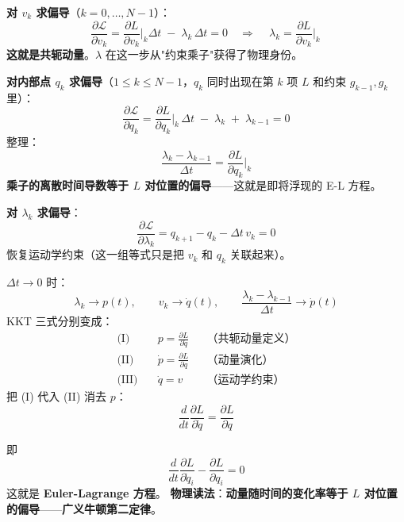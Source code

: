 \documentclass[12pt, a4paper]{ctexart}
\begin{document}
\begin{blackboard}

\textbf{对 $v_k$ 求偏导}（$k = 0, \ldots, N-1$）：
\[
\frac{\partial \mathcal{L}}{\partial v_k}
= \frac{\partial L}{\partial v_k}\bigg|_k \Delta t \;-\; \lambda_k\,\Delta t = 0
\quad\Longrightarrow\quad
\boxed{\,\lambda_k = \frac{\partial L}{\partial v_k}\bigg|_k\,}
\]
\textbf{这就是共轭动量}。$\lambda$ 在这一步从"约束乘子"获得了物理身份。

\textbf{对内部点 $q_k$ 求偏导}（$1 \le k \le N-1$，$q_k$ 同时出现在第 $k$ 项 $L$ 和约束 $g_{k-1}, g_k$ 里）：
\[
\frac{\partial \mathcal{L}}{\partial q_k}
= \frac{\partial L}{\partial q_k}\bigg|_k\,\Delta t \;-\; \lambda_k \;+\; \lambda_{k-1} = 0
\]
整理：
\[
\boxed{\,\frac{\lambda_k - \lambda_{k-1}}{\Delta t} = \frac{\partial L}{\partial q_k}\bigg|_k\,}
\]
\textbf{乘子的离散时间导数等于 $L$ 对位置的偏导}——这就是即将浮现的 E-L 方程。

\textbf{对 $\lambda_k$ 求偏导}：
\[
\frac{\partial \mathcal{L}}{\partial \lambda_k} = q_{k+1} - q_k - \Delta t\,v_k = 0
\]
恢复运动学约束（这一组等式只是把 $v_k$ 和 $q_k$ 关联起来）。

\end{blackboard}

\begin{blackboard}

$\Delta t \to 0$ 时：
\[
\lambda_k \to p(t),\qquad v_k \to \dot q(t),\qquad \frac{\lambda_k-\lambda_{k-1}}{\Delta t} \to \dot p(t)
\]
KKT 三式分别变成：
\begin{align*}
\text{(I)}\quad & p = \frac{\partial L}{\partial \dot q} &&\text{（共轭动量定义）}\\
\text{(II)}\quad & \dot p = \frac{\partial L}{\partial q} &&\text{（动量演化）}\\
\text{(III)}\quad & \dot q = v &&\text{（运动学约束）}
\end{align*}
把 (I) 代入 (II) 消去 $p$：
\[
\frac{d}{dt}\frac{\partial L}{\partial \dot q} = \frac{\partial L}{\partial q}
\]

即
\[
\boxed{\;\frac{d}{dt}\frac{\partial L}{\partial \dot q_i} - \frac{\partial L}{\partial q_i} = 0\;}
\]
这就是 \textbf{Euler-Lagrange 方程}。
\textbf{物理读法}：\textbf{动量随时间的变化率等于 $L$ 对位置的偏导}——\textbf{广义牛顿第二定律}。

\end{blackboard}
\end{document}
